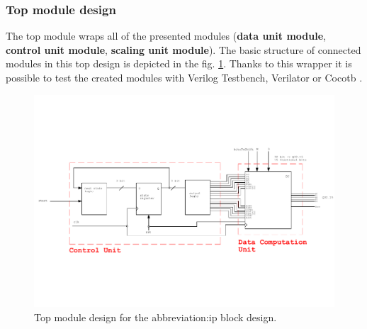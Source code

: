 \documentclass[a4paper, twoside, 11pt]{article}
\newcommand{\fbar}{\FloatBarrier}
\begin{document}
\subsubsection{Top module design}\label{subsubsec:division-top-module-design}
The top module wraps all of the presented modules (\textbf{data unit module}, \textbf{control unit module}, \textbf{scaling unit module}). The basic structure of connected modules in this top design is depicted in the fig. \ref{fig:division-top-module}. Thanks to this wrapper it is possible to test the created modules with Verilog Testbench, Verilator \cite{verilator} or Cocotb \cite{cocotb}.
\begin{figure}[htbp!]
  \centering
  \includegraphics[width=1\textwidth]{src/pdf/top-module.pdf}
   \caption{Top module design for the \gls{abbreviation:ip} block design.}
  \label{fig:division-top-module}
\end{figure}



\fbar
\end{document}
